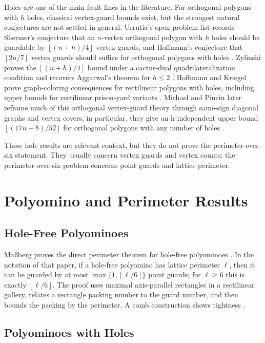\documentclass[11pt]{article}
\newcommand{\floor}[1]{\left\lfloor #1 \right\rfloor}
\newcommand{\loversix}{\floor{\ell/6}}
\begin{document}
Holes are one of the main fault lines in the literature.  For orthogonal
polygons with $h$ holes, classical vertex-guard bounds exist, but the strongest
natural conjectures are not settled in general.  Urrutia's open-problem list
records Shermer's conjecture that an $n$-vertex orthogonal polygon with $h$
holes should be guardable by $\floor{(n+h)/4}$ vertex guards, and Hoffmann's
conjecture that $\floor{2n/7}$ vertex guards should suffice for orthogonal
polygons with holes \cite{UrrutiaOpenProblems}.  Zylinski proves the
$\floor{(n+h)/4}$ bound under a cactus-dual quadrilateralization condition and
recovers Aggarwal's theorem for $h \leq 2$ \cite{Zylinski2006}.  Hoffmann and
Kriegel prove graph-coloring consequences for rectilinear polygons with holes,
including upper bounds for rectilinear prison-yard variants
\cite{HoffmannKriegel1996}.  Michael and Pinciu later reframe much of this
orthogonal vertex-guard theory through same-sign diagonal graphs and vertex
covers; in particular, they give an h-independent upper bound
$\floor{(17n-8)/52}$ for orthogonal polygons with any number of holes
\cite{MichaelPinciu2016}.

These hole results are relevant context, but they do not prove the
perimeter-over-six statement.  They usually concern vertex guards and vertex
counts; the perimeter-over-six problem concerns point guards and lattice
perimeter.

\section{Polyomino and Perimeter Results}

\subsection{Hole-Free Polyominoes}

Ma{\ss}berg proves the direct perimeter theorem for hole-free polyominoes
\cite[Theorem~1]{Massberg2014}.  In the notation of that paper, if a
hole-free polyomino has lattice perimeter $\ell$, then it can be guarded by at
most $\max\{1,\loversix\}$ point guards; for $\ell \geq 6$ this is exactly
$\loversix$.  The proof uses maximal axis-parallel rectangles in a rectilinear
gallery, relates a rectangle packing number to the guard number, and then
bounds the packing by the perimeter.  A comb construction shows tightness
\cite[Fig.~3 and p.~575]{Massberg2014}.

\subsection{Polyominoes with Holes}
\end{document}
